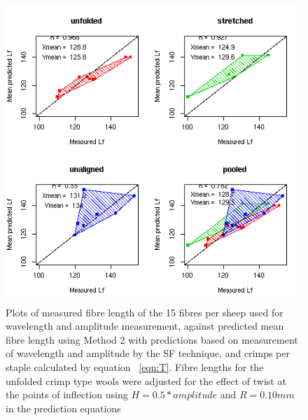 %

\begin{figure}[!h]
  \centering
  \includegraphics[width=1.1\textwidth]{figsfpredlflf15.png}
  \caption{Plots of measured fibre length of the 15 fibres per sheep used for wavelength and amplitude measurement, against predicted mean fibre length using Method 2 with predictions based on measurement of wavelength and amplitude by the SF technique, and crimps per staple calculated by equation ~\ref{eqn:T}. Fibre lengths for the unfolded crimp type wools were adjusted for the effect of twist at the points of inflection using $H = 0.5 * amplitude$ and $R = 0.10 mm$ in the prediction equations }
  \label{fig:sfpredlf.lf15}
\end{figure}

%

